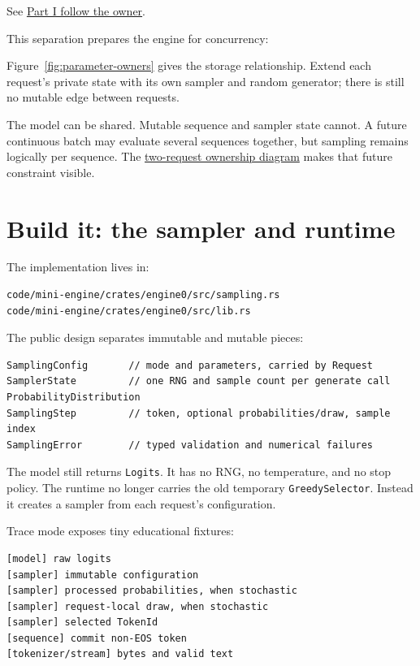 See
\href{https://github.com/hermonai/inside-the-llm-engine/blob/astra-visual-rewrite/diagrams/sampling/part1-follow-owner.txt}{Part
I follow the owner}.

This separation prepares the engine for concurrency:

Figure~\ref{fig:parameter-owners} gives the storage relationship. Extend
each request's private state with its own sampler and random generator;
there is still no mutable edge between requests.

The model can be shared. Mutable sequence and sampler state cannot. A
future continuous batch may evaluate several sequences together, but
sampling remains logically per sequence. The
\href{https://github.com/hermonai/inside-the-llm-engine/blob/astra-visual-rewrite/diagrams/sampling/model-two-requests.txt}{two-request
ownership diagram} makes that future constraint visible.

\section{Build it: the sampler and
runtime}\label{build-it-the-sampler-and-runtime}

The  implementation lives in:

\begin{verbatim}
code/mini-engine/crates/engine0/src/sampling.rs
code/mini-engine/crates/engine0/src/lib.rs
\end{verbatim}

The public design separates immutable and mutable pieces:

\begin{verbatim}
SamplingConfig       // mode and parameters, carried by Request
SamplerState         // one RNG and sample count per generate call
ProbabilityDistribution
SamplingStep         // token, optional probabilities/draw, sample index
SamplingError        // typed validation and numerical failures
\end{verbatim}

The model still returns \texttt{Logits}. It has no RNG, no temperature,
and no stop policy. The runtime no longer carries the old temporary
\texttt{GreedySelector}. Instead it creates a sampler from each
request's configuration.

Trace mode exposes tiny educational fixtures:

\begin{verbatim}
[model] raw logits
[sampler] immutable configuration
[sampler] processed probabilities, when stochastic
[sampler] request-local draw, when stochastic
[sampler] selected TokenId
[sequence] commit non-EOS token
[tokenizer/stream] bytes and valid text
\end{verbatim}

